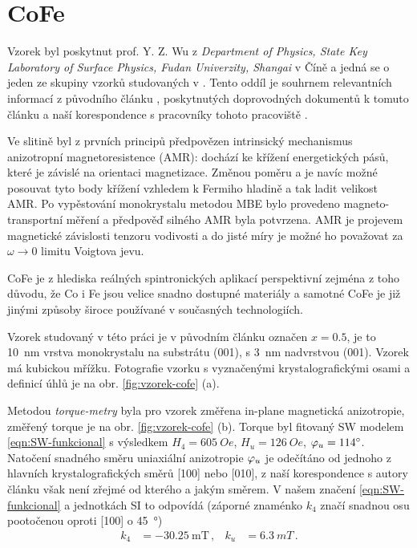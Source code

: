 \section{CoFe}
\label{chap:vzorek-cofe}

Vzorek byl poskytnut prof. Y. Z. Wu z \emph{Department of Physics, State Key Laboratory of Surface Physics, Fudan Univerzity, Shangai} v Číně a jedná se o jeden ze skupiny vzorků studovaných v \cite{zengIntrinsicMechanismAnisotropic2020}.
Tento oddíl je souhrnem relevantních informací z původního článku \cite{zengIntrinsicMechanismAnisotropic2020}, poskytnutých doprovodných dokumentů k tomuto článku a naší korespondence s pracovníky tohoto pracoviště \cite{wuUstniSdeleni}.

Ve slitině  byl z prvních principů předpovězen intrinsický mechanismus anizotropní magnetoresistence (AMR): dochází ke křížení energetických pásů, které je závislé na orientaci magnetizace.
Změnou poměru  a  je navíc možné posouvat tyto body křížení vzhledem k Fermiho hladině a tak ladit velikost AMR.
Po vypěstování monokrystalu metodou MBE bylo provedeno magneto-transportní měření a předpověď silného AMR byla potvrzena\cite{zengIntrinsicMechanismAnisotropic2020}.
AMR je projevem magnetické závislosti tenzoru vodivosti a do jisté míry je možné ho považovat za $\omega\to 0$ limitu Voigtova jevu\cite{tesarovaSystematicStudyMagnetic2014}.

CoFe je z hlediska reálných spintronických aplikací perspektivní zejména z to\-ho důvodu, že Co i Fe jsou velice snadno dostupné materiály a samotné CoFe je již jinými způsoby široce používané v současných technologiích.

Vzorek studovaný v této práci je v původním článku označen $x=0.5$, je to \SI{10}{\nano\meter} vrstva monokrystalu  na substrátu (001), s \SI{3}{\nano\meter} nadvrstvou (001).
Vzorek má kubickou mřížku.
Fotografie vzorku s vyznačenými krystalografickými osami a definicí úhlů je na obr. \ref{fig:vzorek-cofe} (a).

Metodou \emph{torque-metry} byla pro vzorek změřena in-plane magnetická ani\-zo\-tro\-pie, změřený torque je na obr. \ref{fig:vzorek-cofe} (b).
Torque byl fitovaný SW modelem \eqref{eqn:SW-funkcional} s výsledkem $H_4=\SI{605}{Oe}$, $H_u=\SI{126}{Oe}$, $\varphi_u=\SI{114}{\degree}$.
Natočení snadného směru uniaxiální anizotropie $\varphi_u$ je odečítáno od jednoho z hlavních krystalografických směrů [100] nebo [010], z naší korespondence s autory článku \cite{zengIntrinsicMechanismAnisotropic2020} však není zřejmé od kterého a jakým směrem.
V našem značení \eqref{eqn:SW-funkcional} a jednotkách SI to odpovídá (záporné znaménko $k_4$ značí snadnou osu pootočenou oproti [100] o \SI{45}{\degree})
\begin{align}
\label{eqn:cofe-anizotropni-konstanty-cina}
k_4 &= -\SI{30.25}{\milli\tesla} \,, & k_u &= \SI{6.3}{mT} \,.
\end{align}

